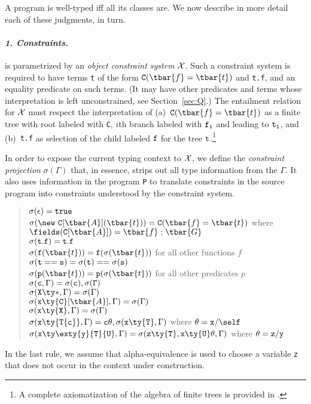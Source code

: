A program is well-typed iff all its classes are. We now describe in more detail each of these judgments, in turn. 


\paragraph{\normalfont\bf\em 1. Constraints.}
{}\FXG{} is parametrized by an {\em object constraint system} $\cal
X$.  Such a constraint system is required to have terms {\tt t} of the
form ${\tt C}(\tbar{f}=\tbar{t})$ and {\tt t.f}, and an equality
predicate on such terms. (It may have other predicates and terms whose interpretation is left unconstrained, see Section~\ref{sec:Q}.)
The entailment relation for $\cal X$ must respect the interpretation of
(a)~${\tt C}(\tbar{f}=\tbar{t})$ as a finite tree with root
labeled with {\tt C}, $i$th branch labeled with $\tt f_i$ and leading to
$\tt t_i$, and (b)~{\tt t.f} as selection of the child labeled
$\tt f$ for the tree $\tt t$.\footnote{A complete axiomatization of the algebra of finite trees is provided in \cite{maher-tree}.}

In order to expose the current typing context to $\cal X$, we define
the {\em constraint projection} $\sigma(\Gamma)$ that, in essence,
strips out all type information from the $\Gamma$. It also uses
information in the program {\tt P} to translate constraints in the source
program into constraints understood by the constraint system.
 
\begin{quote}
\noindent $\sigma(\epsilon)={\tt true}$\\
$\sigma(\new~{\tt C}[\tbar{A}](\tbar{t}))={\tt C}(\tbar{f}=\tbar{t})$ 
 where $\fields({\tt C}[\tbar{A}])=\tbar{f}:\tbar{G}$\\
$\sigma({\tt t.f}) = {\tt t.f}$\\
$\sigma({\tt f}(\tbar{t}))={\tt f}(\sigma(\tbar{t}))$  for all other functions $f$\\
$\sigma({\tt t==s})=\sigma({\tt t})==\sigma(\tt {s})$\\
$\sigma({\tt p}(\tbar{t}))={\tt p}(\sigma(\tbar{t}))$  for all other predicates $p$\\
$\sigma({\tt c},\Gamma) = \sigma(\tt c), \sigma(\Gamma)$\\
$\sigma({\tt X}\ty*, \Gamma)=\sigma(\Gamma)$\\
$\sigma({\tt x}\ty{\tt C}[\tbar{A}], \Gamma)=\sigma(\Gamma)$\\
$\sigma({\tt x}\ty{\tt X}, \Gamma)=\sigma(\Gamma)$\\
$\sigma({\tt x}\ty{\tt T\{c\}}, \Gamma)={\tt c}\theta,\sigma({\tt x}\ty{\tt T},\Gamma)$  where $\theta={\tt x}/\self$\\
$\sigma({\tt x}\ty\exty{{\tt y}}{{\tt T}}{{\tt U}}, \Gamma)=\sigma({\tt z}\ty{\tt T}, {\tt x}\ty{\tt U}\theta,\Gamma)$  where $\theta={\tt z}/{\tt y}$
\end{quote}
%
In the last rule, we assume that alpha-equivalence is used to choose a variable {\tt z} that does not occur in the context under construction.

